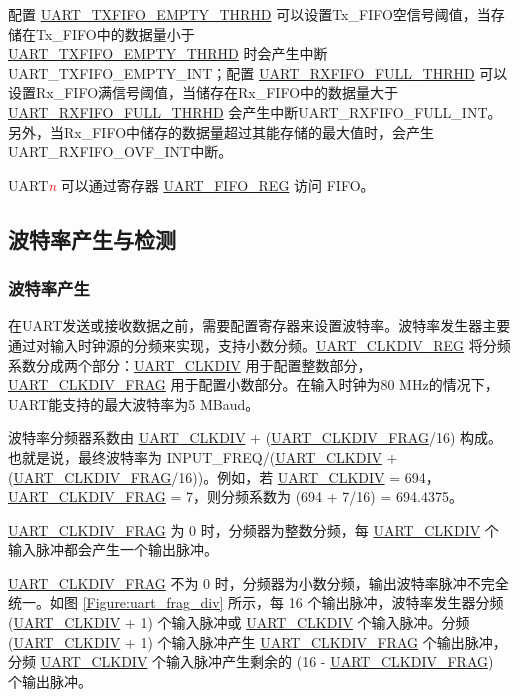 \documentclass[main\_\_CN.tex]{subfiles}
\begin{document}
配置 \hyperref[fielddesc:UARTTXFIFOEMPTYTHRHD]{UART\_TXFIFO\_EMPTY\_THRHD} 可以设置Tx\_FIFO空信号阈值，当存储在Tx\_FIFO中的数据量小于 \\\hyperref[fielddesc:UARTTXFIFOEMPTYTHRHD]{UART\_TXFIFO\_EMPTY\_THRHD} 时会产生中断UART\_TXFIFO\_EMPTY\_INT；配置 \hyperref[fielddesc:UARTRXFIFOFULLTHRHD]{UART\_RXFIFO\_FULL\_THRHD} 可以设置Rx\_FIFO满信号阈值，当储存在Rx\_FIFO中的数据量大于 \hyperref[fielddesc:UARTRXFIFOFULLTHRHD]{UART\_RXFIFO\_FULL\_THRHD} 会产生中断UART\_RXFIFO\_FULL\_INT。另外，当Rx\_FIFO中储存的数据量超过其能存储的最大值时，会产生UART\_RXFIFO\_OVF\_INT中断。

UART\textcolor{red}{\it{n}} 可以通过寄存器 \hyperref[regdesc:UARTFIFOREG]{UART\_FIFO\_REG} 访问 FIFO。

\subsection{波特率产生与检测}

\subsubsection{波特率产生}

在UART发送或接收数据之前，需要配置寄存器来设置波特率。波特率发生器主要通过对输入时钟源的分频来实现，支持小数分频。\hyperref[regdesc:UARTCLKDIVREG]{UART\_CLKDIV\_REG} 将分频系数分成两个部分：\hyperref[fielddesc:UARTCLKDIV]{UART\_CLKDIV} 用于配置整数部分，\hyperref[fielddesc:UARTCLKDIVFRAG]{UART\_CLKDIV\_FRAG} 用于配置小数部分。在输入时钟为80 MHz的情况下，UART能支持的最大波特率为5 MBaud。

波特率分频器系数由 \hyperref[fielddesc:UARTCLKDIV]{UART\_CLKDIV} + (\hyperref[fielddesc:UARTCLKDIVFRAG]{UART\_CLKDIV\_FRAG}/16) 构成。也就是说，最终波特率为 INPUT\_FREQ/(\hyperref[fielddesc:UARTCLKDIV]{UART\_CLKDIV} + (\hyperref[fielddesc:UARTCLKDIVFRAG]{UART\_CLKDIV\_FRAG}/16))。例如，若 \hyperref[fielddesc:UARTCLKDIV]{UART\_CLKDIV} = 694，\hyperref[fielddesc:UARTCLKDIVFRAG]{UART\_CLKDIV\_FRAG} = 7，则分频系数为 (694 + 7/16) = 694.4375。

\hyperref[fielddesc:UARTCLKDIVFRAG]{UART\_CLKDIV\_FRAG} 为 0 时，分频器为整数分频，每 \hyperref[fielddesc:UARTCLKDIV]{UART\_CLKDIV} 个输入脉冲都会产生一个输出脉冲。

\hyperref[fielddesc:UARTCLKDIVFRAG]{UART\_CLKDIV\_FRAG} 不为 0 时，分频器为小数分频，输出波特率脉冲不完全统一。如图 \ref{Figure:uart_frag_div} 所示，每 16 个输出脉冲，波特率发生器分频 (\hyperref[fielddesc:UARTCLKDIV]{UART\_CLKDIV} + 1) 个输入脉冲或 \hyperref[fielddesc:UARTCLKDIV]{UART\_CLKDIV} 个输入脉冲。分频 (\hyperref[fielddesc:UARTCLKDIV]{UART\_CLKDIV} + 1) 个输入脉冲产生 \hyperref[fielddesc:UARTCLKDIVFRAG]{UART\_CLKDIV\_FRAG} 个输出脉冲，分频 \hyperref[fielddesc:UARTCLKDIV]{UART\_CLKDIV} 个输入脉冲产生剩余的 (16 - \hyperref[fielddesc:UARTCLKDIVFRAG]{UART\_CLKDIV\_FRAG}) 个输出脉冲。
\end{document}
